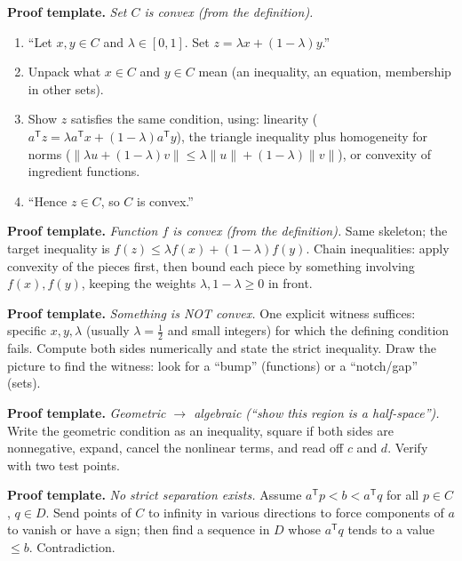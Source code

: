 \documentclass[11pt]{article}
\newenvironment{template}{\begin{framed}\noindent\textbf{Proof template.} }{\end{framed}}
\newcommand{\T}{^{\mathsf T}}
\newcommand{\lam}{\lambda}
\theoremstyle{definition}
\theoremstyle{plain}
\theoremstyle{remark}
\begin{document}
\begin{template}
\emph{Set $C$ is convex (from the definition).}
\begin{enumerate}
\item ``Let $x,y\in C$ and $\lam\in[0,1]$. Set $z=\lam x+(1-\lam)y$.''
\item Unpack what $x\in C$ and $y\in C$ mean (an inequality, an equation, membership in other sets).
\item Show $z$ satisfies the same condition, using: linearity ($a\T z=\lam a\T x+(1-\lam)a\T y$), the triangle inequality plus homogeneity for norms ($\|\lam u+(1-\lam)v\|\le\lam\|u\|+(1-\lam)\|v\|$), or convexity of ingredient functions.
\item ``Hence $z\in C$, so $C$ is convex.''
\end{enumerate}
\end{template}

\begin{template}
\emph{Function $f$ is convex (from the definition).} Same skeleton; the target inequality is $f(z)\le\lam f(x)+(1-\lam)f(y)$. Chain inequalities: apply convexity of the pieces first, then bound each piece by something involving $f(x),f(y)$, keeping the weights $\lam,1-\lam\ge0$ in front.
\end{template}

\begin{template}
\emph{Something is NOT convex.} One explicit witness suffices: specific $x,y,\lam$ (usually $\lam=\tfrac12$ and small integers) for which the defining condition fails. Compute both sides numerically and state the strict inequality. Draw the picture to find the witness: look for a ``bump'' (functions) or a ``notch/gap'' (sets).
\end{template}

\begin{template}
\emph{Geometric $\to$ algebraic (``show this region is a half-space'').} Write the geometric condition as an inequality, square if both sides are nonnegative, expand, cancel the nonlinear terms, and read off $c$ and $d$. Verify with two test points.
\end{template}

\begin{template}
\emph{No strict separation exists.} Assume $a\T p<b<a\T q$ for all $p\in C$, $q\in D$. Send points of $C$ to infinity in various directions to force components of $a$ to vanish or have a sign; then find a sequence in $D$ whose $a\T q$ tends to a value $\le b$. Contradiction.
\end{template}
\end{document}
